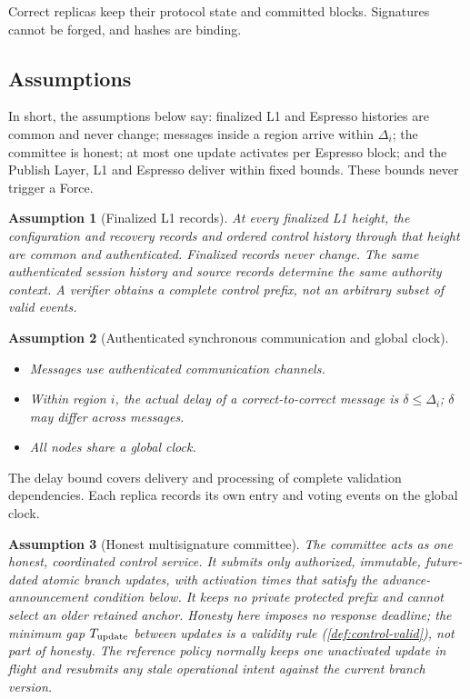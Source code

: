 \documentclass[11pt,a4paper]{article}
\newtheorem{assumption}[assumption]{Assumption}
\newcounter{protocol}
\begin{document}
Correct replicas keep their protocol state and committed blocks.
Signatures cannot be forged, and hashes are binding.

\subsection{Assumptions}
\label{sec:assumptions}
In short, the assumptions below say: finalized L1 and Espresso histories
are common and never change; messages inside a region arrive within
$\Delta_i$; the committee is honest; at most one update activates per
Espresso block; and the Publish Layer, L1 and Espresso deliver within
fixed bounds. These bounds never trigger a Force.
\begin{assumption}[Finalized L1 records]
\label{ass:authority}
At every finalized L1 height, the configuration and recovery records
and ordered control history through that height are common and
authenticated. Finalized records never change. The same authenticated
session history and source records determine the same authority context.
A verifier obtains a complete control
prefix, not an arbitrary subset of valid events.
\end{assumption}

\begin{assumption}[Authenticated synchronous communication and global clock]
\label{ass:network}
\leavevmode\par
\begin{itemize}
\item Messages use authenticated communication channels.
\item Within region $i$, the actual delay of a correct-to-correct
message is $\delta\le\Delta_i$; $\delta$ may differ across messages.
\item All nodes share a global clock.
\end{itemize}
\end{assumption}
The delay bound covers delivery and processing of complete validation
dependencies. Each replica records its own entry and voting events on
the global clock.

\begin{assumption}[Honest multisignature committee]
\label{ass:committee}
The committee acts as one honest, coordinated control service. It
submits only authorized, immutable, future-dated atomic branch updates, with
activation times that satisfy the advance-announcement condition below. It keeps no private protected prefix and cannot select
an older retained anchor. Honesty here imposes no response deadline; the
minimum gap $T_{\rm update}$ between updates is a validity rule
(\cref{def:control-valid}), not part of honesty.  The reference policy
normally keeps one unactivated update in flight and resubmits any stale
operational intent against the current branch version.
\end{assumption}
\end{document}
